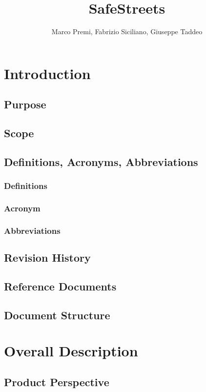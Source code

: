 \documentclass{article}
\title{SafeStreets}
\author{Marco Premi, Fabrizio Siciliano, Giuseppe Taddeo}
\begin{document}
\maketitle

\newpage

\tableofcontents
\newpage

\section{Introduction}
\subsection{Purpose}
\subsection{Scope}
\subsection{Definitions, Acronyms, Abbreviations}
\subsubsection{Definitions}
\subsubsection{Acronym}
\subsubsection{Abbreviations}
\subsection{Revision History}
\subsection{Reference Documents}
\subsection{Document Structure}
\section{Overall Description}
\subsection{Product Perspective}
\end{document}
